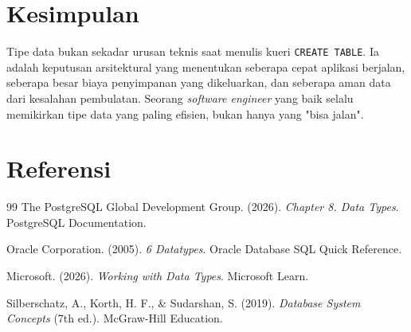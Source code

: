 \documentclass[11pt,a4paper]{article}
\begin{document}
\section{Kesimpulan}

Tipe data bukan sekadar urusan teknis saat menulis kueri \texttt{CREATE TABLE}. Ia adalah keputusan arsitektural yang menentukan seberapa cepat aplikasi berjalan, seberapa besar biaya penyimpanan yang dikeluarkan, dan seberapa aman data dari kesalahan pembulatan. Seorang \textit{software engineer} yang baik selalu memikirkan tipe data yang paling efisien, bukan hanya yang "bisa jalan".

\newpage
\section*{Referensi}

\begin{thebibliography}{99}
	The PostgreSQL Global Development Group. (2026). \textit{Chapter 8. Data Types}. PostgreSQL Documentation.

	Oracle Corporation. (2005). \textit{6 Datatypes}. Oracle Database SQL Quick Reference.

	Microsoft. (2026). \textit{Working with Data Types}. Microsoft Learn.

	Silberschatz, A., Korth, H. F., \& Sudarshan, S. (2019). \textit{Database System Concepts} (7th ed.). McGraw-Hill Education.
\end{thebibliography}
\end{document}
